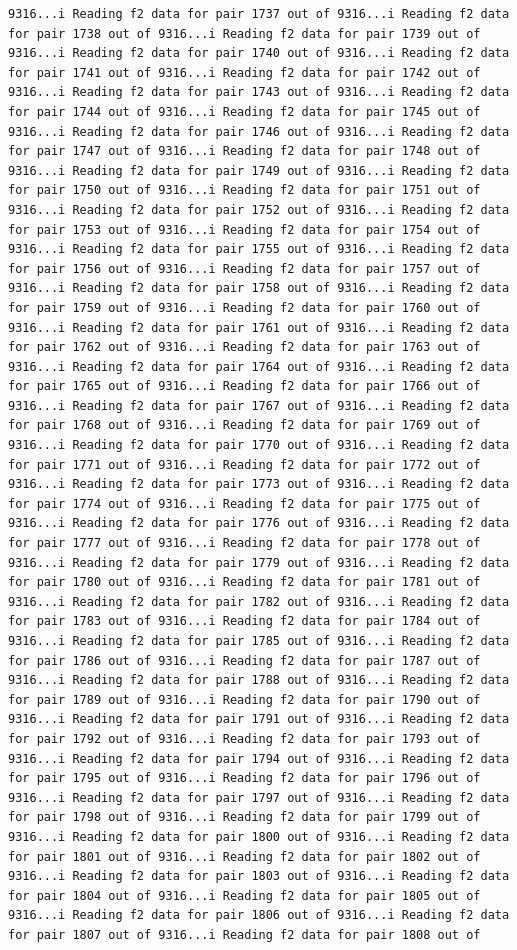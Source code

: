 \documentclass[
]{article}
\begin{document}
\begin{verbatim}
9316...i Reading f2 data for pair 1737 out of 9316...i Reading f2 data for pair 1738 out of 9316...i Reading f2 data for pair 1739 out of 9316...i Reading f2 data for pair 1740 out of 9316...i Reading f2 data for pair 1741 out of 9316...i Reading f2 data for pair 1742 out of 9316...i Reading f2 data for pair 1743 out of 9316...i Reading f2 data for pair 1744 out of 9316...i Reading f2 data for pair 1745 out of 9316...i Reading f2 data for pair 1746 out of 9316...i Reading f2 data for pair 1747 out of 9316...i Reading f2 data for pair 1748 out of 9316...i Reading f2 data for pair 1749 out of 9316...i Reading f2 data for pair 1750 out of 9316...i Reading f2 data for pair 1751 out of 9316...i Reading f2 data for pair 1752 out of 9316...i Reading f2 data for pair 1753 out of 9316...i Reading f2 data for pair 1754 out of 9316...i Reading f2 data for pair 1755 out of 9316...i Reading f2 data for pair 1756 out of 9316...i Reading f2 data for pair 1757 out of 9316...i Reading f2 data for pair 1758 out of 9316...i Reading f2 data for pair 1759 out of 9316...i Reading f2 data for pair 1760 out of 9316...i Reading f2 data for pair 1761 out of 9316...i Reading f2 data for pair 1762 out of 9316...i Reading f2 data for pair 1763 out of 9316...i Reading f2 data for pair 1764 out of 9316...i Reading f2 data for pair 1765 out of 9316...i Reading f2 data for pair 1766 out of 9316...i Reading f2 data for pair 1767 out of 9316...i Reading f2 data for pair 1768 out of 9316...i Reading f2 data for pair 1769 out of 9316...i Reading f2 data for pair 1770 out of 9316...i Reading f2 data for pair 1771 out of 9316...i Reading f2 data for pair 1772 out of 9316...i Reading f2 data for pair 1773 out of 9316...i Reading f2 data for pair 1774 out of 9316...i Reading f2 data for pair 1775 out of 9316...i Reading f2 data for pair 1776 out of 9316...i Reading f2 data for pair 1777 out of 9316...i Reading f2 data for pair 1778 out of 9316...i Reading f2 data for pair 1779 out of 9316...i Reading f2 data for pair 1780 out of 9316...i Reading f2 data for pair 1781 out of 9316...i Reading f2 data for pair 1782 out of 9316...i Reading f2 data for pair 1783 out of 9316...i Reading f2 data for pair 1784 out of 9316...i Reading f2 data for pair 1785 out of 9316...i Reading f2 data for pair 1786 out of 9316...i Reading f2 data for pair 1787 out of 9316...i Reading f2 data for pair 1788 out of 9316...i Reading f2 data for pair 1789 out of 9316...i Reading f2 data for pair 1790 out of 9316...i Reading f2 data for pair 1791 out of 9316...i Reading f2 data for pair 1792 out of 9316...i Reading f2 data for pair 1793 out of 9316...i Reading f2 data for pair 1794 out of 9316...i Reading f2 data for pair 1795 out of 9316...i Reading f2 data for pair 1796 out of 9316...i Reading f2 data for pair 1797 out of 9316...i Reading f2 data for pair 1798 out of 9316...i Reading f2 data for pair 1799 out of 9316...i Reading f2 data for pair 1800 out of 9316...i Reading f2 data for pair 1801 out of 9316...i Reading f2 data for pair 1802 out of 9316...i Reading f2 data for pair 1803 out of 9316...i Reading f2 data for pair 1804 out of 9316...i Reading f2 data for pair 1805 out of 9316...i Reading f2 data for pair 1806 out of 9316...i Reading f2 data for pair 1807 out of 9316...i Reading f2 data for pair 1808 out of 
\end{verbatim}
\end{document}
